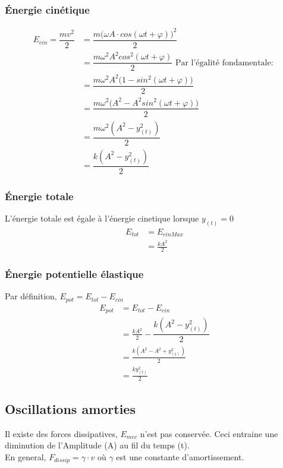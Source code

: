 \documentclass[11pt]{article}
\begin{document}
\subsubsection{Énergie cinétique}
\begin{equation}
\begin{split}
    E_{cin}  = \dfrac{mv^2}{2} & = \dfrac{m\Big(\omega A \cdot cos(\omega t+ \varphi)\Big)^2}{2} \\
    & =\dfrac{ m\omega^2 A^2 cos^2(\omega t+ \varphi)}{2} \text{ Par l'égalité fondamentale: } \\
    & = \dfrac{ m\omega^2 A^2 \Big(1-sin^2(\omega t+ \varphi)\Big)}{2} \\
    & =\dfrac{m\omega^2\Big(A^2-A^2sin^2(\omega t+ \varphi)\Big)}{2} \\
    & =\dfrac{m\omega^2(A^2-y_{(t)}^2)}{2} \\
    & = \dfrac{k(A^2-y_{(t)}^2)}{2}
\end{split}
\end{equation}
\subsubsection{Énergie totale}
 L'énergie totale est égale à l'énergie cinetique lorsque $y_{(t)}=0$ \\
 \begin{equation}
     \begin{split}
         E_{tot} & = E_{cinMax}\\
        & = \frac{kA^2}{2}
     \end{split}
 \end{equation}
\subsubsection{Énergie potentielle élastique}
Par définition, $E_{pot} = E_{tot}-E_{cin}$ \\
\begin{equation}
    \begin{split}
        E_{pot} & = E_{tot}-E_{cin} \\
        & = \frac{kA^2}{2} - \dfrac{k(A^2-y_{(t)}^2)}{2} \\
        & = \frac{k(A^2-A^2+y_{(t)}^2)}{2} \\
        & = \frac{ky_{(t)}^2}{2}
    \end{split}
\end{equation}

\subsection{Oscillations amorties}
Il existe des forces dissipatives, $E_{mec}$ n'est pas conservée. Ceci entraine une diminution de l'Amplitude (A) au fil du temps (t).\\
En general, $F_{dissip}=\gamma \cdot v$ où $\gamma$ est une constante d'amortissement.
\end{document}
